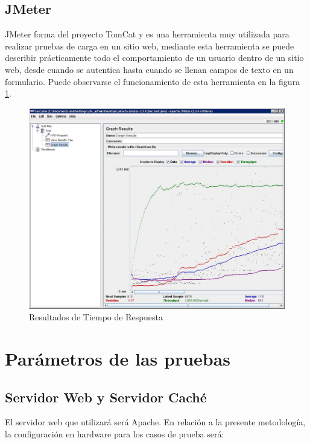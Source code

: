 
\subsection{JMeter}

JMeter forma del proyecto TomCat y es una herramienta muy utilizada para realizar pruebas de carga en un sitio web, mediante esta herramienta se puede describir prácticamente todo el comportamiento de un usuario dentro de un sitio web, desde cuando se autentica hasta cuando se llenan campos de texto en un formulario. Puede observarse el funcionamiento de esta herramienta en la figura \ref{jmeter}.

\begin{figure}[h]
  \centering
    \includegraphics[scale=0.4]{gfx/jmeter}
  \caption{Resultados de Tiempo de Respuesta}
  \label{jmeter}
\end{figure}




\section{Parámetros de las pruebas}
\label{sec:parametros_pruebas}

\subsection{Servidor Web y Servidor Caché}
\label{subsec:servidor_web}
El servidor web que utilizará será Apache. En relación a la presente metodología, la configuración en hardware para los casos de prueba será:

